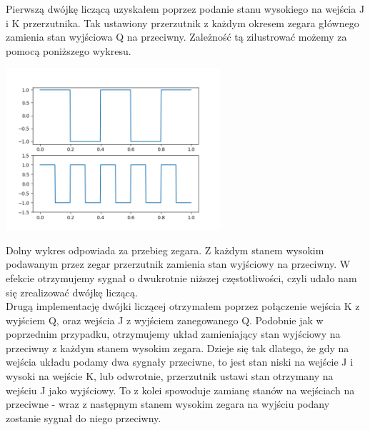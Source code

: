 \documentclass{article}
\begin{document}
            Pierwszą dwójkę liczącą uzyskałem poprzez podanie stanu wysokiego na wejścia J i K przerzutnika. Tak ustawiony przerzutnik z każdym okresem zegara głównego zamienia stan wyjściowa Q na przeciwny. Zależność tą zilustrować możemy za pomocą poniższego wykresu. 
            \begin{center}
                \includegraphics[height=6cm]{reports/plot/square_plot.png}\\
            \end{center}
            \FloatBarrier
            Dolny wykres odpowiada za przebieg zegara. Z każdym stanem wysokim podawanym przez zegar przerzutnik zamienia stan wyjściowy na przeciwny. W efekcie otrzymujemy sygnał o dwukrotnie niższej częstotliwości, czyli udało nam się zrealizować dwójkę liczącą.\\
            Drugą implementację dwójki liczącej otrzymałem poprzez połączenie wejścia K z wyjściem Q, oraz wejścia J z wyjściem zanegowanego Q. Podobnie jak w poprzednim przypadku, otrzymujemy układ zamieniający stan wyjściowy na przeciwny z każdym stanem wysokim zegara. Dzieje się tak dlatego, że gdy na wejścia układu podamy dwa sygnały przeciwne, to jest stan niski na wejście J i wysoki na wejście K, lub odwrotnie, przerzutnik ustawi stan otrzymany na wejściu J jako wyjściowy. To z kolei spowoduje zamianę stanów na wejściach na przeciwne - wraz z następnym stanem wysokim zegara na wyjściu podany zostanie sygnał do niego przeciwny. 
        
\end{document}
